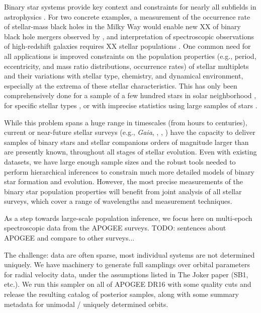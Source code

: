 \documentclass[modern]{aastex63}
\begin{document}
Binary star systems provide key context and constraints for nearly all subfields
in astrophysics \citep[e.g.,][]{Breivik:BAAS, Rix:BAAS}.
For two concrete examples, a measurement of the occurrence rate of stellar-mass
black holes in the Milky Way would enable new XX of binary black hole mergers
observed by  \citep{LIGO:BH1, LIGO:catalog}, and interpretation of
spectroscopic observations of high-redshift galaxies requires XX stellar
populations \cite[e.g.,][]{Eldridge:2017}.
One common need for all applications is improved constraints on the population
properties (e.g., period, eccentricity, and mass ratio distributions, occurrence
rates) of stellar multiplets and their variations with stellar type, chemistry,
and dynamical environment, especially at the extrema of these stellar
characteristics.
This has only been comprehensively done for a sample of a few hundred stars in
solar neighborhood \citep{Raghavan:2010}, for specific stellar types
\citep[e.g.,][]{Moe:2017}, or with imprecise statistics using large samples of
stars \citep{Badenes:2018}.

While this problem spans a huge range in timescales (from hours to centuries),
current or near-future stellar surveys (e.g., \textit{Gaia}, \apogee,
, ) have the capacity to deliver samples of
binary stars and stellar companions orders of magnitude larger than are
presently known, throughout all stages of stellar evolution.
Even with existing datasets, we have large enough sample sizes and the robust
tools needed to perform hierarchical inferences to constrain much more detailed
models of binary star formation and evolution.
However, the most precise measurements of the binary star population properties
will benefit from joint analysis of all stellar surveys, which cover a range of
wavelengths and measurement techniques.

As a step towards large-scale population inference, we focus here on multi-epoch
spectroscopic data from the APOGEE surveys.
TODO: sentences about APOGEE and compare to other surveys...

The challenge: data are often sparse, most individual systems are not determined
uniquely.
We have machinery to generate full samplings over orbital parameters for radial
velocity data, under the assumptions listed in The Joker paper (SB1, etc.).
We run this sampler on all of APOGEE DR16 with some quality cuts and release the
resulting catalog of posterior samples, along with some summary metadata for
unimodal / uniquely determined orbits.
\end{document}
